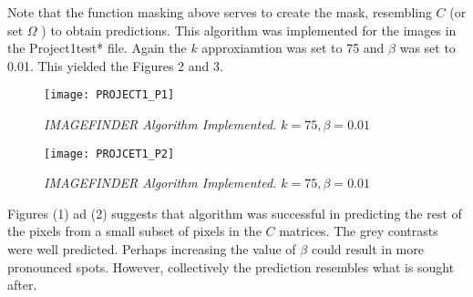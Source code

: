 \documentclass{article}
\begin{document}
Note that the function masking above serves to create the mask, resembling $C$  (or set $\Omega$ ) to obtain predictions. This algorithm was implemented for the images in the  Project1test* file. Again the $k$ approxiamtion was set to 75 and $\beta$ was set to 0.01. This yielded the Figures 2 and 3.  
 \begin{wrapfigure}{l}{0.55\textwidth}
\texttt{[image: PROJECT1\_P1]}
\caption{\emph{IMAGEFINDER Algorithm Implemented. $k=75, \beta =0.01$}}
\end{wrapfigure}

  \begin{wrapfigure}{r}{0.45\textwidth}
\texttt{[image: PROJCET1\_P2]}
\caption{\emph{IMAGEFINDER Algorithm Implemented. $k=75, \beta =0.01$}}
\end{wrapfigure}
Figures (1) ad (2) suggests that algorithm was successful in predicting the rest of the pixels from a small subset of pixels in the $C$ matrices. The grey contrasts were well predicted.  Perhaps increasing the value of $\beta$ could result in more pronounced spots. However, collectively the prediction resembles what is sought after. 
\end{document}
